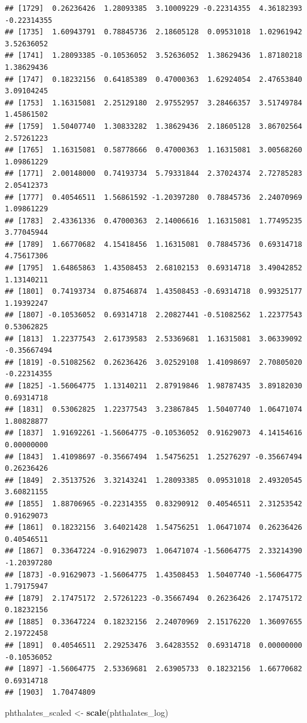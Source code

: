 \documentclass[
]{article}
\newenvironment{Shaded}{\begin{snugshade}}{\end{snugshade}}
\newcommand{\FunctionTok}[1]{\textcolor[rgb]{0.13,0.29,0.53}{\textbf{#1}}}
\newcommand{\NormalTok}[1]{#1}
\newcommand{\OtherTok}[1]{\textcolor[rgb]{0.56,0.35,0.01}{#1}}
\begin{document}
\begin{verbatim}
## [1729]  0.26236426  1.28093385  3.10009229 -0.22314355  4.36182393 -0.22314355
## [1735]  1.60943791  0.78845736  2.18605128  0.09531018  1.02961942  3.52636052
## [1741]  1.28093385 -0.10536052  3.52636052  1.38629436  1.87180218  1.38629436
## [1747]  0.18232156  0.64185389  0.47000363  1.62924054  2.47653840  3.09104245
## [1753]  1.16315081  2.25129180  2.97552957  3.28466357  3.51749784  1.45861502
## [1759]  1.50407740  1.30833282  1.38629436  2.18605128  3.86702564  2.57261223
## [1765]  1.16315081  0.58778666  0.47000363  1.16315081  3.00568260  1.09861229
## [1771]  2.00148000  0.74193734  5.79331844  2.37024374  2.72785283  2.05412373
## [1777]  0.40546511  1.56861592 -1.20397280  0.78845736  2.24070969  1.09861229
## [1783]  2.43361336  0.47000363  2.14006616  1.16315081  1.77495235  3.77045944
## [1789]  1.66770682  4.15418456  1.16315081  0.78845736  0.69314718  4.75617306
## [1795]  1.64865863  1.43508453  2.68102153  0.69314718  3.49042852  1.13140211
## [1801]  0.74193734  0.87546874  1.43508453 -0.69314718  0.99325177  1.19392247
## [1807] -0.10536052  0.69314718  2.20827441 -0.51082562  1.22377543  0.53062825
## [1813]  1.22377543  2.61739583  2.53369681  1.16315081  3.06339092 -0.35667494
## [1819] -0.51082562  0.26236426  3.02529108  1.41098697  2.70805020 -0.22314355
## [1825] -1.56064775  1.13140211  2.87919846  1.98787435  3.89182030  0.69314718
## [1831]  0.53062825  1.22377543  3.23867845  1.50407740  1.06471074  1.80828877
## [1837]  1.91692261 -1.56064775 -0.10536052  0.91629073  4.14154616  0.00000000
## [1843]  1.41098697 -0.35667494  1.54756251  1.25276297 -0.35667494  0.26236426
## [1849]  2.35137526  3.32143241  1.28093385  0.09531018  2.49320545  3.60821155
## [1855]  1.88706965 -0.22314355  0.83290912  0.40546511  2.31253542  0.91629073
## [1861]  0.18232156  3.64021428  1.54756251  1.06471074  0.26236426  0.40546511
## [1867]  0.33647224 -0.91629073  1.06471074 -1.56064775  2.33214390 -1.20397280
## [1873] -0.91629073 -1.56064775  1.43508453  1.50407740 -1.56064775  1.79175947
## [1879]  2.17475172  2.57261223 -0.35667494  0.26236426  2.17475172  0.18232156
## [1885]  0.33647224  0.18232156  2.24070969  2.15176220  1.36097655  2.19722458
## [1891]  0.40546511  2.29253476  3.64283552  0.69314718  0.00000000 -0.10536052
## [1897] -1.56064775  2.53369681  2.63905733  0.18232156  1.66770682  0.69314718
## [1903]  1.70474809
\end{verbatim}

\begin{Shaded}
\begin{Highlighting}[]
\NormalTok{phthalates\_scaled }\OtherTok{\textless{}{-}} \FunctionTok{scale}\NormalTok{(phthalates\_log)}
\end{Highlighting}
\end{Shaded}
\end{document}
